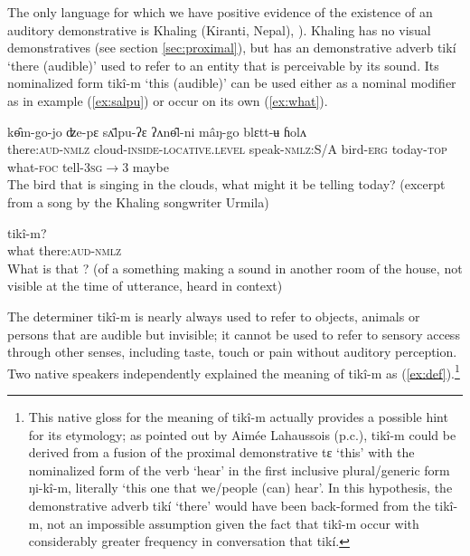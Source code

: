 \documentclass[oneside,a4paper,11pt]{article}
\newcommand{\ipa}[1]{{\phon \mbox{#1}}} %
\begin{document}
The only language for which we have positive evidence of the existence of an auditory demonstrative is Khaling (Kiranti, Nepal), \citealt{jacques14auditory}). Khaling has no visual demonstratives (see section \ref{sec:proximal}), but has an demonstrative adverb \ipa{tikí} `there (audible)' used to refer to an entity that is perceivable by its sound. Its nominalized form \ipa{tikî-m} `this (audible)' can be used either as a nominal modifier as in  example (\ref{ex:salpu}) or occur on its own (\ref{ex:what}). 

\begin{exe}
\ex \label{ex:salpu}
\gll    	 	\ipa{tikî-m}   	\ipa{kɵ̂m-go-jo}   	\ipa{ʣe-pɛ}   	\ipa{sʌ̄lpu-ʔɛ}   	\ipa{ʔʌnɵ̂l-ni}   	\ipa{mâŋ-go}   	\ipa{blɛtt-ʉ}   	\ipa{ɦolʌ}   
 \\
 there:\textsc{aud}-\textsc{nmlz} cloud-\textsc{inside-locative.level} speak-\textsc{nmlz:}S/A bird-\textsc{erg} today-\textsc{top} what-\textsc{foc} tell-\textsc{3sg$\rightarrow$3} maybe \\
\glt The bird that is singing in the clouds, what might it be telling today? (excerpt from a song by the Khaling songwriter Urmila)
\end{exe}

\begin{exe}
\ex \label{ex:what}
\gll  	\ipa{mâŋ}  	 	\ipa{tikî-m?}   \\
what  there:\textsc{aud}-\textsc{nmlz} \\
\glt What is that ? (of a something making a sound in another room of the house, not visible at the time of utterance, heard in context)
\end{exe}

The determiner \ipa{tikî-m} is nearly always used to refer to objects, animals or persons  that are audible but invisible; it cannot be used to refer to sensory access through other senses, including taste, touch or pain without auditory perception. Two native speakers independently explained the meaning of  \ipa{tikî-m} as (\ref{ex:def}).\footnote{This native gloss for the meaning of \ipa{tikî-m} actually provides a possible hint for its etymology; as pointed out by Aimée Lahaussois (p.c.), \ipa{tikî-m} could be derived from a fusion of the proximal demonstrative \ipa{tɛ} `this' with the nominalized form of the verb `hear' in the first inclusive plural/generic form \ipa{ŋi-kî-m}, literally `this one that we/people (can) hear'. In this hypothesis, the demonstrative adverb \ipa{tikí} `there' would have been back-formed from the \ipa{tikî-m}, not an impossible assumption given the fact that  \ipa{tikî-m} occur with considerably greater frequency in conversation that  \ipa{tikí}. }
\end{document}

